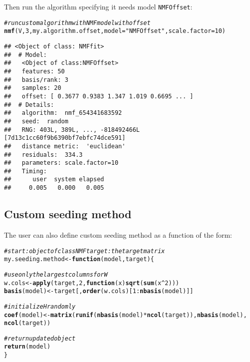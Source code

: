 \documentclass[a4paper]{article}\usepackage[]{graphicx}\usepackage[]{color}
\makeatletter
\newcommand{\hlnum}[1]{\textcolor[rgb]{0.686,0.059,0.569}{#1}}%
\newcommand{\hlstr}[1]{\textcolor[rgb]{0.192,0.494,0.8}{#1}}%
\newcommand{\hlcom}[1]{\textcolor[rgb]{0.678,0.584,0.686}{\textit{#1}}}%
\newcommand{\hlopt}[1]{\textcolor[rgb]{0,0,0}{#1}}%
\newcommand{\hlstd}[1]{\textcolor[rgb]{0.345,0.345,0.345}{#1}}%
\newcommand{\hlkwa}[1]{\textcolor[rgb]{0.161,0.373,0.58}{\textbf{#1}}}%
\newcommand{\hlkwb}[1]{\textcolor[rgb]{0.69,0.353,0.396}{#1}}%
\newcommand{\hlkwc}[1]{\textcolor[rgb]{0.333,0.667,0.333}{#1}}%
\newcommand{\hlkwd}[1]{\textcolor[rgb]{0.737,0.353,0.396}{\textbf{#1}}}%
\newenvironment{kframe}{%
 \def\at@end@of@kframe{}%
 \ifinner\ifhmode%
  \def\at@end@of@kframe{\end{minipage}}%
  \begin{minipage}{\columnwidth}%
 \fi\fi%
 \def\FrameCommand##1{\hskip\@totalleftmargin \hskip-\fboxsep
 \colorbox{shadecolor}{##1}\hskip-\fboxsep
     \hskip-\linewidth \hskip-\@totalleftmargin \hskip\columnwidth}%
 \MakeFramed {\advance\hsize-\width
   \@totalleftmargin\z@ \linewidth\hsize
   \@setminipage}}%
 {\par\unskip\endMakeFramed%
 \at@end@of@kframe}
\newenvironment{knitrout}{}{} %
\let\code=\texttt
\makeatother
\begin{document}
Then run the algorithm specifying it needs model \code{NMFOffset}:
\begin{knitrout}
\color{fgcolor}\begin{kframe}
\begin{alltt}
\hlcom{# run custom algorithm with NMF model with offset}
\hlkwd{nmf}\hlstd{(V,} \hlnum{3}\hlstd{, my.algorithm.offset,} \hlkwc{model} \hlstd{=} \hlstr{"NMFOffset"}\hlstd{,} \hlkwc{scale.factor} \hlstd{=} \hlnum{10}\hlstd{)}
\end{alltt}
\begin{verbatim}
## <Object of class: NMFfit>
##  # Model:
##   <Object of class:NMFOffset>
##   features: 50 
##   basis/rank: 3 
##   samples: 20 
##   offset: [ 0.3677 0.9383 1.347 1.019 0.6695 ... ]
##  # Details:
##   algorithm:  nmf_654341683592 
##   seed:  random 
##   RNG: 403L, 389L, ..., -818492466L [7d13c1cc60f9b6390bf7ebfc74dce591]
##   distance metric:  'euclidean' 
##   residuals:  334.3 
##   parameters: scale.factor=10 
##   Timing:
##      user  system elapsed 
##     0.005   0.000   0.005
\end{verbatim}
\end{kframe}
\end{knitrout}



\subsection{Custom seeding method}\label{sec:seed_custom}

The user can also define custom seeding method as a function of the form:


\begin{knitrout}
\color{fgcolor}\begin{kframe}
\begin{alltt}
\hlcom{# start: object of class NMF target: the target matrix}
\hlstd{my.seeding.method} \hlkwb{<-} \hlkwa{function}\hlstd{(}\hlkwc{model}\hlstd{,} \hlkwc{target}\hlstd{) \{}

    \hlcom{# use only the largest columns for W}
    \hlstd{w.cols} \hlkwb{<-} \hlkwd{apply}\hlstd{(target,} \hlnum{2}\hlstd{,} \hlkwa{function}\hlstd{(}\hlkwc{x}\hlstd{)} \hlkwd{sqrt}\hlstd{(}\hlkwd{sum}\hlstd{(x}\hlopt{^}\hlnum{2}\hlstd{)))}
    \hlkwd{basis}\hlstd{(model)} \hlkwb{<-} \hlstd{target[,} \hlkwd{order}\hlstd{(w.cols)[}\hlnum{1}\hlopt{:}\hlkwd{nbasis}\hlstd{(model)]]}

    \hlcom{# initialize H randomly}
    \hlkwd{coef}\hlstd{(model)} \hlkwb{<-} \hlkwd{matrix}\hlstd{(}\hlkwd{runif}\hlstd{(}\hlkwd{nbasis}\hlstd{(model)} \hlopt{*} \hlkwd{ncol}\hlstd{(target)),} \hlkwd{nbasis}\hlstd{(model),}
        \hlkwd{ncol}\hlstd{(target))}

    \hlcom{# return updated object}
    \hlkwd{return}\hlstd{(model)}
\hlstd{\}}
\end{alltt}
\end{kframe}
\end{knitrout}
\end{document}

